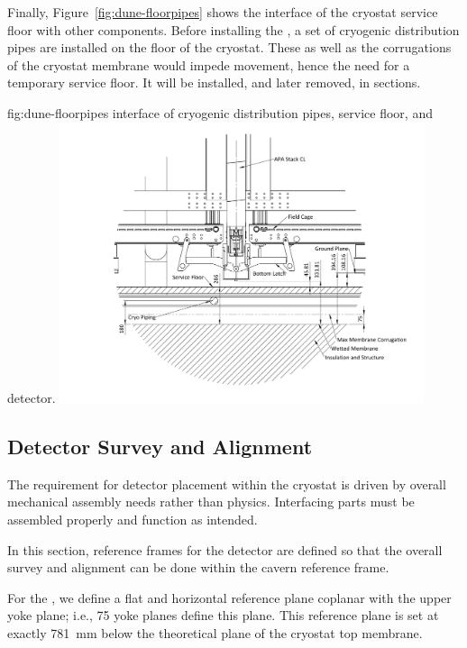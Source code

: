 Finally, Figure~\ref{fig:dune-floorpipes} shows the interface of the
cryostat service floor with other components.  Before installing the
, a set of cryogenic distribution pipes are installed
on the floor of the cryostat. These as well as the corrugations of the
cryostat membrane would impede movement, hence the need for
a temporary service floor. It will be installed, and later removed, in sections. 
\begin{dunefigure}{fig:dune-floorpipes}
{ interface of cryogenic distribution pipes, service
  floor, and detector.}
\includegraphics[width=0.8\textwidth]{graphics/Interface_lower_mid_apa.pdf}
\end{dunefigure}

\subsection{Detector Survey and Alignment}
\label{sec:fdsp-coord-integ-survey}

The requirement for detector placement within the cryostat is driven
by overall mechanical assembly needs rather than physics.
Interfacing parts must be assembled properly and function as intended.


In this section, reference frames for the detector are defined so that the
overall survey and alignment can be done within the cavern reference
frame.

For the , we define a flat and horizontal reference plane
coplanar with the upper  yoke plane; i.e., 75 yoke planes
define this plane. This reference plane is set at exactly \SI{781}{mm}
below the theoretical plane of the cryostat top membrane.


